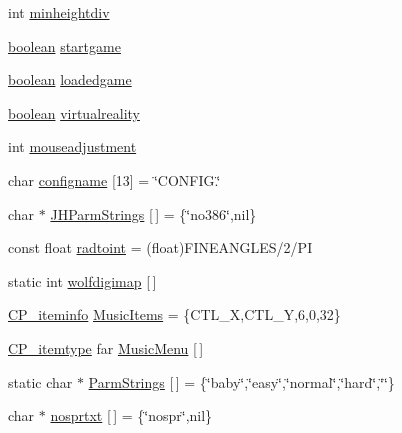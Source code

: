 \begin{DoxyCompactItemize}
int \hyperlink{WL__MAIN_8C_a45b3f03d729e26d91cddc22055a35e54}{minheightdiv}
\item 
\hyperlink{ID__HEAD_8H_a7c6368b321bd9acd0149b030bb8275ed}{boolean} \hyperlink{WL__MAIN_8C_abd09f97b0a5a9701196dba3f6e6c7978}{startgame}
\item 
\hyperlink{ID__HEAD_8H_a7c6368b321bd9acd0149b030bb8275ed}{boolean} \hyperlink{WL__MAIN_8C_a2361eb57d882933d300f22fae83e8fa0}{loadedgame}
\item 
\hyperlink{ID__HEAD_8H_a7c6368b321bd9acd0149b030bb8275ed}{boolean} \hyperlink{WL__MAIN_8C_a19f0beeaba2b97e5c1c18467d930de1c}{virtualreality}
\item 
int \hyperlink{WL__MAIN_8C_a8dcec22af342ab93acb6d66d85b69140}{mouseadjustment}
\item 
char \hyperlink{WL__MAIN_8C_af1798aca3dc8c86728240ad581d646f7}{configname} \mbox{[}13\mbox{]} = \char`\"{}CONFIG.\char`\"{}
\item 
char $\ast$ \hyperlink{WL__MAIN_8C_a8bb692025d52ae676447974bf167c8c2}{JHParmStrings} \mbox{[}$\,$\mbox{]} = \{\char`\"{}no386\char`\"{},nil\}
\item 
const float \hyperlink{WL__MAIN_8C_a96225f6b9b90cf6fe6087d34795b9037}{radtoint} = (float)FINEANGLES/2/PI
\item 
static int \hyperlink{WL__MAIN_8C_a82000528367f0aa6e7e5ea3df81ac488}{wolfdigimap} \mbox{[}$\,$\mbox{]}
\item 
\hyperlink{structCP__iteminfo}{CP\_\-iteminfo} \hyperlink{WL__MAIN_8C_a6e6e340c87aac09f698443f10add2d51}{MusicItems} = \{CTL\_\-X,CTL\_\-Y,6,0,32\}
\item 
\hyperlink{structCP__itemtype}{CP\_\-itemtype} far \hyperlink{WL__MAIN_8C_adcf7140c950b56fed629f6553542555f}{MusicMenu} \mbox{[}$\,$\mbox{]}
\item 
static char $\ast$ \hyperlink{WL__MAIN_8C_af8599e1c1fbb3afabbdaa22e7c4a94b0}{ParmStrings} \mbox{[}$\,$\mbox{]} = \{\char`\"{}baby\char`\"{},\char`\"{}easy\char`\"{},\char`\"{}normal\char`\"{},\char`\"{}hard\char`\"{},\char`\"{}\char`\"{}\}
\item 
char $\ast$ \hyperlink{WL__MAIN_8C_aff857ab1c5f74eb9b19dffcad87e4dcb}{nosprtxt} \mbox{[}$\,$\mbox{]} = \{\char`\"{}nospr\char`\"{},nil\}
\end{DoxyCompactItemize}


